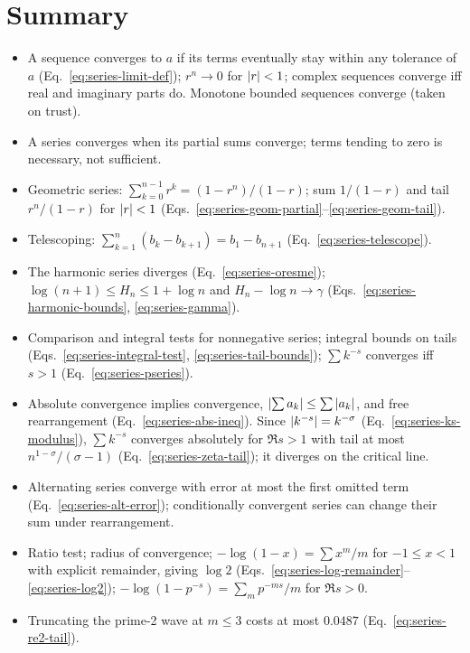\section{Summary}

\begin{itemize}
\item A sequence converges to $a$ if its terms eventually stay within any tolerance of $a$ (Eq.~\eqref{eq:series-limit-def}); $r^n\to0$ for $\left\lvert r\right\rvert<1$; complex sequences converge iff real and imaginary parts do. Monotone bounded sequences converge (taken on trust).
\item A series converges when its partial sums converge; terms tending to zero is necessary, not sufficient.
\item Geometric series: $\sum_{k=0}^{n-1}r^k=(1-r^n)/(1-r)$; sum $1/(1-r)$ and tail $r^n/(1-r)$ for $\left\lvert r\right\rvert<1$ (Eqs.~\eqref{eq:series-geom-partial}--\eqref{eq:series-geom-tail}).
\item Telescoping: $\sum_{k=1}^n(b_k-b_{k+1})=b_1-b_{n+1}$ (Eq.~\eqref{eq:series-telescope}).
\item The harmonic series diverges (Eq.~\eqref{eq:series-oresme}); $\log(n+1)\le H_n\le1+\log n$ and $H_n-\log n\to\gamma$ (Eqs.~\eqref{eq:series-harmonic-bounds}, \eqref{eq:series-gamma}).
\item Comparison and integral tests for nonnegative series; integral bounds on tails (Eqs.~\eqref{eq:series-integral-test}, \eqref{eq:series-tail-bounds}); $\sum k^{-s}$ converges iff $s>1$ (Eq.~\eqref{eq:series-pseries}).
\item Absolute convergence implies convergence, $\left\lvert \sum a_k\right\rvert\le\sum\left\lvert a_k\right\rvert$, and free rearrangement (Eq.~\eqref{eq:series-abs-ineq}). Since $\left\lvert k^{-s}\right\rvert=k^{-\sigma}$ (Eq.~\eqref{eq:series-ks-modulus}), $\sum k^{-s}$ converges absolutely for $\Re s>1$ with tail at most $n^{1-\sigma}/(\sigma-1)$ (Eq.~\eqref{eq:series-zeta-tail}); it diverges on the critical line.
\item Alternating series converge with error at most the first omitted term (Eq.~\eqref{eq:series-alt-error}); conditionally convergent series can change their sum under rearrangement.
\item Ratio test; radius of convergence; $-\log(1-x)=\sum x^m/m$ for $-1\le x<1$ with explicit remainder, giving $\log2$ (Eqs.~\eqref{eq:series-log-remainder}--\eqref{eq:series-log2}); $-\log(1-p^{-s})=\sum_mp^{-ms}/m$ for $\Re s>0$.
\item Truncating the prime-2 wave at $m\le3$ costs at most $0.0487$ (Eq.~\eqref{eq:series-re2-tail}).

\end{itemize}
